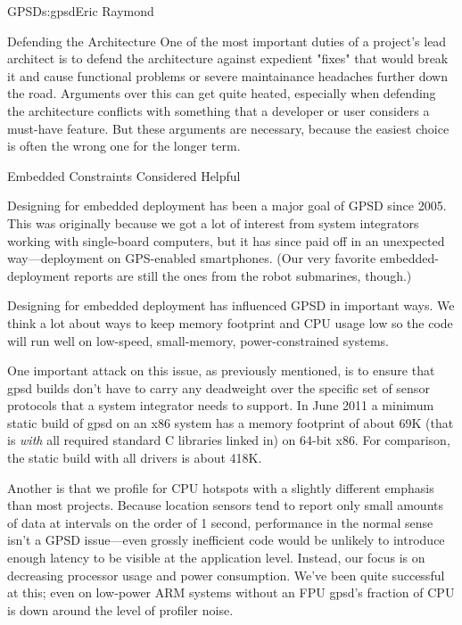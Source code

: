 \begin{aosachapter}{GPSD}{s:gpsd}{Eric Raymond}
\begin{aosasect1}{Defending the Architecture}
One of the most important duties of a project's lead architect is to
defend the architecture against expedient "fixes" that would break it
and cause functional problems or severe maintainance headaches further
down the road.  Arguments over this can get quite heated, especially
when defending the architecture conflicts with something that a
developer or user considers a must-have feature.  But these arguments
are necessary, because the easiest choice is often the wrong one for
the longer term.

\end{aosasect1}

\begin{aosasect1}{Embedded Constraints Considered Helpful}

Designing for embedded deployment has been a major goal of GPSD since
2005. This was originally because we got a lot of interest from system
integrators working with single-board computers, but it has since paid
off in an unexpected way---deployment on GPS-enabled smartphones. (Our
very favorite embedded-deployment reports are still the ones from the
robot submarines, though.)

Designing for embedded deployment has influenced GPSD in important
ways.  We think a lot about ways to keep memory footprint and CPU
usage low so the code will run well on low-speed, small-memory,
power-constrained systems.

One important attack on this issue, as previously mentioned, is to
ensure that gpsd builds don't have to carry any deadweight over the
specific set of sensor protocols that a system integrator needs to
support. In June 2011 a minimum static build of gpsd on an x86 system
has a memory footprint of about 69K (that is \emph{with} all required
standard C libraries linked in) on 64-bit x86. For comparison, the static
build with all drivers is about 418K.

Another is that we profile for CPU hotspots with a slightly different
emphasis than most projects. Because location sensors tend to report
only small amounts of data at intervals on the order of 1 second,
performance in the normal sense isn't a GPSD issue---even grossly
inefficient code would be unlikely to introduce enough latency to be
visible at the application level.  Instead, our focus is on decreasing
processor usage and power consumption.  We've been quite successful at
this; even on low-power ARM systems without an FPU gpsd's fraction of 
CPU is down around the level of profiler noise.


\end{aosasect1}
\end{aosachapter}
